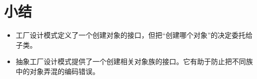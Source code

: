 
\section*{小结}

\begin{itemize}
\item 工厂设计模式定义了一个创建对象的接口，但把“创建哪个对象”的决定委托给子类。
\item 抽象工厂设计模式提供了一个创建相关对象族的接口。它有助于防止把不同族中的对象弄混的编码错误。
\end{itemize}
